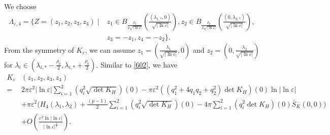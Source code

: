 \documentclass[12pt,reqno]{amsart}
\numberwithin{equation}{section}
\theoremstyle{definition}
\theoremstyle{remark}
\begin{document}
We choose 
\begin{equation*} 
	\begin{split}
		\Lambda_{\varepsilon, 4}=\bigg\{Z=(  z_1,  z_2, z_3, z_4) \mid &z_1\in B_{\frac{\rho_0}{2\sqrt{|\ln\varepsilon|}}}\left (\frac{(\lambda_{1,*},0)}{\sqrt{|\ln\varepsilon|}}\right ), z_2\in B_{\frac{\rho_0}{2\sqrt{|\ln\varepsilon|}}}\left (\frac{(0,\lambda_{2,*})}{\sqrt{|\ln\varepsilon|}}\right ),\\
		&z_3=-z_1,z_4=-z_2\bigg\}.
	\end{split}
\end{equation*}
From the symmetry of $ K_\varepsilon $, we can assume $ z_1=\left( \frac{\lambda_1}{\sqrt{|\ln\varepsilon|}},0\right)  $ and $ z_2=\left( 0,\frac{\lambda_2}{\sqrt{|\ln\varepsilon|}}\right)  $ for $\lambda_i\in \left( \lambda_{i,*}-\frac{\rho_0}{2}, \lambda_{i,*}+\frac{\rho_0}{2}\right)   $. %
Similar to \eqref{602}, we have
\begin{equation} \label{704}
	\begin{split}
		K_\varepsilon&\left (z_1,z_2,z_3,z_4\right )\\
		=&2\pi\varepsilon^2|\ln\varepsilon|\sum_{i=1}^2\left( q_i^2\sqrt{\det K_H}\right) (0) -\pi\varepsilon^2\left( \left( q_1^2+4q_1q_2+q_2^2 \right) \det K_H \right)(0)\ln|\ln\varepsilon|\\
		&+\pi\varepsilon^2\bigg(    H_4(\lambda_1,\lambda_2)+\frac{(p-1)}{2}   \sum_{i=1}^2\left( q_i^2\sqrt{\det K_H}\right) (0)      -4\pi  \sum_{i=1}^2 \left( q_i^2  \det K_H\right)(0) \bar{S}_K(0,0)\bigg) \\ 
		&+O\left( \frac{\varepsilon^2\ln|\ln\varepsilon|}{|\ln\varepsilon|^{\frac{1}{2}}}\right).
	\end{split}
\end{equation}
\end{document}
